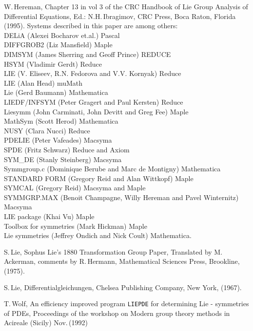 \begin{thebibliography}{99}
 W.\,Hereman, Chapter 13 in vol 3 of the CRC Handbook of
Lie Group Analysis of Differential Equations, Ed.: N.H.\,Ibragimov,
CRC Press, Boca Raton, Florida (1995).
Systems described in this paper are among others:  \\
DELiA (Alexei Bocharov et.al.) Pascal \\
DIFFGROB2 (Liz Mansfield) Maple \\
DIMSYM (James Sherring and Geoff Prince) REDUCE \\
HSYM (Vladimir Gerdt) Reduce \\
LIE (V. Eliseev, R.N. Fedorova and V.V. Kornyak) Reduce \\
LIE (Alan Head) muMath \\
Lie (Gerd Baumann) Mathematica \\
LIEDF/INFSYM (Peter Gragert and Paul Kersten) Reduce \\
Liesymm (John Carminati, John Devitt and Greg Fee) Maple \\
MathSym (Scott Herod) Mathematica \\
NUSY (Clara Nucci) Reduce \\
PDELIE (Peter Vafeades) Macsyma \\
SPDE (Fritz Schwarz) Reduce and Axiom \\
SYM\_DE (Stanly Steinberg) Macsyma \\
Symmgroup.c (Dominique Berube and Marc de Montigny) Mathematica \\
STANDARD FORM (Gregory Reid and Alan Wittkopf) Maple \\
SYMCAL (Gregory Reid) Macsyma and Maple \\
SYMMGRP.MAX (Benoit Champagne, Willy Hereman and Pavel Winternitz) Macsyma \\
LIE package (Khai Vu) Maple \\
Toolbox for symmetries (Mark Hickman) Maple \\
Lie symmetries (Jeffrey Ondich and Nick Coult) Mathematica.

 S.\,Lie, Sophus Lie's 1880 Transformation Group Paper,
Translated by M.\,Ackerman, comments by R.\,Hermann, Mathematical Sciences
Press, Brookline, (1975).

 S.\,Lie, Differentialgleichungen, Chelsea Publishing Company,
New York, (1967).

 T.\,Wolf, An efficiency improved program {\tt LIEPDE}
for determining Lie - symmetries of PDEs, Proceedings of the workshop on
Modern group theory methods in Acireale (Sicily) Nov.\,(1992)


\end{thebibliography}
